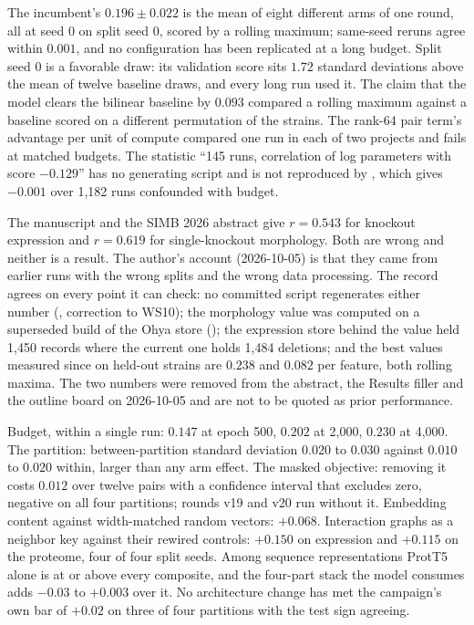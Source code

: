  The incumbent's $0.196 \pm 0.022$ is the mean
of eight different arms of one round, all at seed 0 on split seed 0, scored by a rolling
maximum; same-seed reruns agree within $0.001$, and no configuration has been replicated at
a long budget. Split seed 0 is a favorable draw: its validation score sits $1.72$ standard
deviations above the mean of twelve baseline draws, and every long run used it. The claim
that the model clears the bilinear baseline by $0.093$ compared a rolling maximum against a
baseline scored on a different permutation of the strains. The rank-64 pair term's
advantage per unit of compute compared one run in each of two projects and fails at
matched budgets. The statistic ``145 runs, correlation of log parameters with score
$-0.129$'' has no generating script and is not reproduced by ,
which gives $-0.001$ over 1{,}182 runs confounded with budget.

 The manuscript and the SIMB 2026
abstract give $r = 0.543$ for knockout expression and $r = 0.619$ for single-knockout
morphology. Both are wrong and neither is a result. The author's account (2026-10-05) is
that they came from earlier runs with the wrong splits and the wrong data processing. The
record agrees on every point it can check: no committed script regenerates either number
(, correction to WS10); the morphology value
was computed on a superseded build of the Ohya store
(); the expression store behind the value
held 1{,}450 records where the current one holds 1{,}484 deletions; and the best values
measured since on held-out strains are $0.238$ and $0.082$ per feature, both rolling maxima.
The two numbers were removed from the abstract, the Results filler and the outline board on
2026-10-05 and are not to be quoted as prior performance.

 Budget, within a single run: $0.147$ at epoch 500,
$0.202$ at 2{,}000, $0.230$ at 4{,}000. The partition: between-partition standard deviation
$0.020$ to $0.030$ against $0.010$ to $0.020$ within, larger than any arm effect. The
masked objective: removing it costs $0.012$ over twelve pairs with a confidence interval
that excludes zero, negative on all four partitions; rounds v19 and v20 run without it.
Embedding content against width-matched random vectors: $+0.068$. Interaction graphs as a
neighbor key against their rewired controls: $+0.150$ on expression and $+0.115$ on the
proteome, four of four split seeds. Among sequence representations ProtT5 alone is at or
above every composite, and the four-part stack the model consumes adds $-0.03$ to $+0.003$
over it. No architecture change has met the campaign's own bar of $+0.02$ on three of four
partitions with the test sign agreeing.

